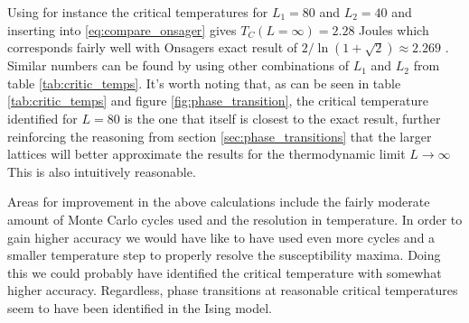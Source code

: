 \documentclass[12pt]{article}
\numberwithin{figure}{section}
\numberwithin{table}{section}
\begin{document}
\noindent Using for instance the critical temperatures for $L_1=80$ and $L_2=40$ and inserting into \eqref{eq:compare_onsager} gives $T_C(L=\infty)=2.28$ Joules which corresponds fairly well with Onsagers exact result of $2/\ln(1+\sqrt{2})\approx 2.269$ \cite{LarsOnsager}. Similar numbers can be found by using other combinations of $L_1$ and $L_2$ from table \ref{tab:critic_temps}. It's worth noting that, as can be seen in table \ref{tab:critic_temps} and figure \ref{fig:phase_transition}, the critical temperature identified for $L=80$ is the one that itself is closest to the exact result, further reinforcing the reasoning from section \ref{sec:phase_transitions} that the larger lattices will better approximate the results for the thermodynamic limit $L\to\infty$ This is also intuitively reasonable.
\vspace{0.30cm}

\noindent Areas for improvement in the above calculations include the fairly moderate amount of Monte Carlo cycles used and the resolution in temperature. In order to gain higher accuracy we would have like to have used even more cycles and a smaller temperature step to properly resolve the susceptibility maxima. Doing this we could probably have identified the critical temperature with somewhat higher accuracy. Regardless, phase transitions at reasonable critical temperatures seem to have been identified in the Ising model.


\end{document}
